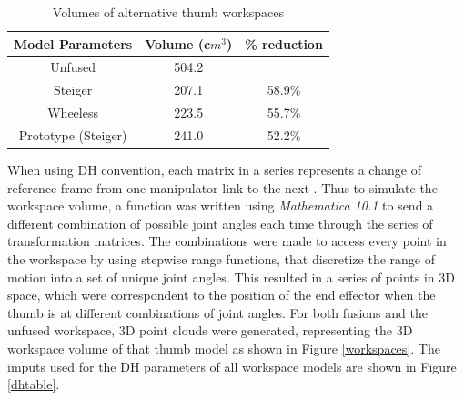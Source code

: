 \documentclass[letterpaper, 10 pt, conference]{ieeeconf}  %
\newcommand{\rFig}[1]{Figure \ref{#1}}
\begin{document}
\begin{table}
	\centering
	\caption{Volumes of alternative thumb workspaces}\label{volumes}
	\begin{tabular}{c|c|c}
		Model Parameters & Volume (c$m^{3}$) & \% reduction \\
		\hline
		Unfused & 504.2 & \\
		Steiger & 207.1 & 58.9\% \\
		Wheeless & 223.5 & 55.7\% \\
		Prototype (Steiger) & 241.0 & 52.2\% \\
		\hline
	\end{tabular}
\end{table}	
	
When using DH convention, each matrix in a series represents a change of reference frame from one manipulator link to the next \cite{}. Thus to simulate the workspace volume, a function was written using \emph{Mathematica 10.1} to send a different combination of possible joint angles each time through the series of transformation matrices. The combinations were made to access every point in the workspace by using stepwise range functions, that discretize the range of motion into a set of unique joint angles. This resulted in a series of points in 3D space, which were correspondent to the position of the end effector when the thumb is at different combinations of joint angles. For both fusions and the unfused workspace, 3D point clouds were generated, representing the 3D workspace volume of that thumb model as shown in \rFig{workspaces}. The imputs used for the DH parameters of all workspace models are shown in \rFig{dhtable}.
\end{document}
